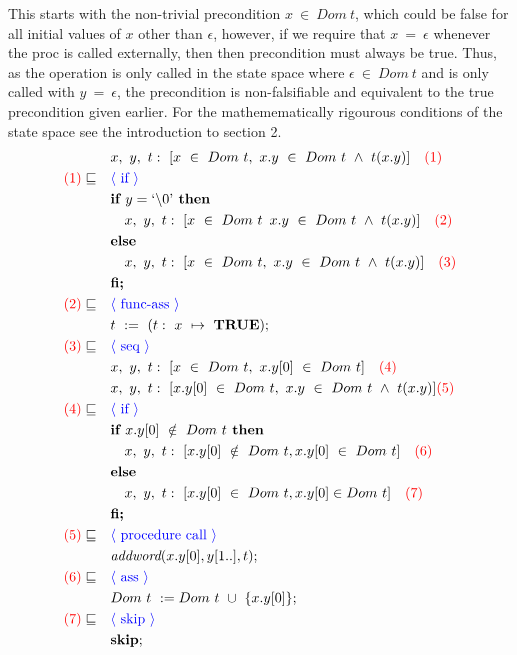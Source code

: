 \documentclass[a4paper, fleqn]{article}
\newcommand{\reason}[1]{\text{\textcolor{blue}{$\langle$ #1 $\rangle$}}}
\newcommand{\num}[1]{\text{\textcolor{red}{(#1)}}}
\begin{document}
This starts with the non-trivial precondition $x\ \in\ Dom\ t$, which could be false for all initial values of $x$ other than $\epsilon$, however, if we require that $x\ =\ \epsilon$ whenever the proc is called externally, then then precondition must always be true. Thus, as the operation is only called in the state space where $\epsilon\ \in\ Dom\ t$ and is only called with $y\ =\ \epsilon$, the precondition is non-falsifiable and equivalent to the true precondition given earlier. For the mathemematically rigourous conditions of the state space see the introduction to section 2.
\begin{align*}
		&\quad x,\ y,\ t:\ [x\ \in\ Dom\ t,\ x.y\ \in\ Dom\ t\ \land\ t(x.y)]\quad\num{1} \\
		\num{1} \sqsubseteq&\quad\reason{if} \\
		&\quad\textbf{if } y = \text{`\textbackslash0'} \textbf{ then} \\
		&\qquad x,\ y,\ t:\ [x\ \in\ Dom\ t\,\ x.y\ \in\ Dom\ t\ \land\ t(x.y)]\quad\num{2} \\
		&\quad\textbf{else} \\
		&\qquad x,\ y,\ t:\ [x\ \in\ Dom\ t,\ x.y \ \in\ Dom\ t\ \land\ t(x.y)]\quad\num{3} \\ 
		&\quad\textbf{fi;} \\
		\num{2} \sqsubseteq&\quad\reason{func-ass} \\
		&\quad t\ :=\ (t:\ x\ \mapsto\ \textbf{TRUE}); \\
		\num{3}\sqsubseteq&\quad\reason{seq} \\
		&\quad x,\ y,\ t:\ [x\ \in\ Dom\ t,\ x.y[0]\ \in\ Dom\ t]\quad\num{4} \\
		&\quad x,\ y,\ t:\ [x.y[0]\ \in\ Dom\ t,\ x.y\ \in\ Dom\ t\ \land\ t(x.y)] \num {5} \\
		\num{4}\sqsubseteq&\quad\reason{if} \\
		&\quad\textbf{if } x.y[0]\ \notin\ Dom\ t\textbf{ then} \\
		&\qquad x,\ y,\ t:\ [x.y[0]\ \notin\ Dom\ t, x.y[0]\ \in\ Dom\ t]\quad\num{6} \\
		&\quad\textbf{else} \\
		&\qquad x,\ y,\ t:\ [x.y[0]\ \in\ Dom\ t, x.y[0] \in Dom\ t]\quad\num{7} \\
		&\quad\textbf{fi;} \\
		\num{5} \sqsubseteq&\quad\reason{procedure call} \\
		&\quad \textit{addword}(x.y[0], y[1..], t); \\
		\num{6} \sqsubseteq&\quad\reason{ass} \\
		&\quad Dom\ t\ := Dom\ t\ \cup\ \{x.y[0]\}; \\
		\num{7} \sqsubseteq&\quad\reason{skip} \\
		&\quad \textbf{skip};
\end{align*}
\end{document}
